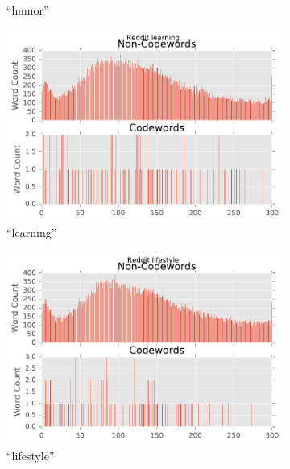 \begin{figure}[H]
\begin{subfigure}[t]{.4\textwidth}
\caption{``humor''}
\label{fig-reddit-humor-count}
\end{subfigure}
\begin{subfigure}[t]{.4\textwidth}
\centering\includegraphics[]{figures/reddit-learning-count.pdf}
\caption{``learning''}
\label{fig-reddit-learning-count}
\end{subfigure}
\begin{subfigure}[t]{.4\textwidth}
\centering\includegraphics[]{figures/reddit-lifestyle-count.pdf}
\caption{``lifestyle''}
\label{fig-reddit-lifestyle-count}
\end{subfigure}
\begin{subfigure}[t]{.4\textwidth}

\end{subfigure}
\end{figure}
